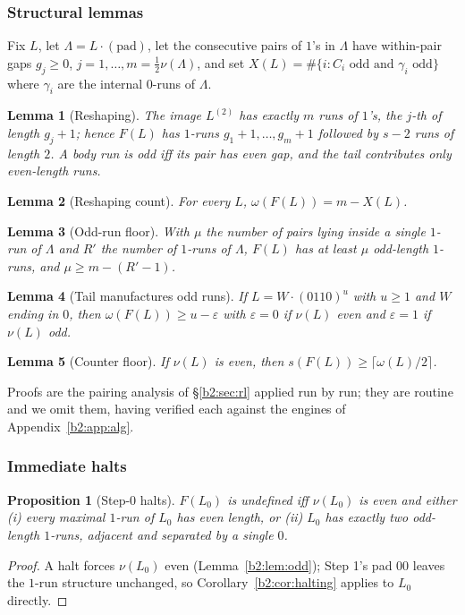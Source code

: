 \documentclass[a4paper]{article}
\theoremstyle{plain}
\newtheorem{proposition}{Proposition}[subsection]
\newtheorem{lemma}{Lemma}[subsection]
\theoremstyle{definition}
\theoremstyle{remark}
\begin{document}
\subsubsection{Structural lemmas}\label{b2:sec:struct}
Fix $L$, let $\Lambda=L\cdot(\text{pad})$, let the consecutive pairs of $1$'s in $\Lambda$ have within-pair gaps $g_j\ge 0$, $j=1,\dots,m=\tfrac12\nu(\Lambda)$, and set $X(L)=\#\{i:C_i\text{ odd and }\gamma_i\text{ odd}\}$ where $\gamma_i$ are the internal $0$-runs of $\Lambda$.

\begin{lemma}[Reshaping]\label{b2:lem:reshape}
The image $L^{(2)}$ has exactly $m$ runs of $1$'s, the $j$-th of length $g_j+1$; hence $F(L)$ has $1$-runs $g_1+1,\dots,g_m+1$ followed by $s-2$ runs of length $2$. A body run is odd iff its pair has even gap, and the tail contributes only even-length runs.
\end{lemma}

\begin{lemma}[Reshaping count]\label{b2:lem:reshapecount}
For every $L$, $\omega(F(L))=m-X(L)$.
\end{lemma}

\begin{lemma}[Odd-run floor]\label{b2:lem:oddrunfloor}
With $\mu$ the number of pairs lying inside a single $1$-run of $\Lambda$ and $R'$ the number of $1$-runs of $\Lambda$, $F(L)$ has at least $\mu$ odd-length $1$-runs, and $\mu\ge m-(R'-1)$.
\end{lemma}

\begin{lemma}[Tail manufactures odd runs]\label{b2:lem:tailodd}
If $L=W\cdot(0110)^u$ with $u\ge 1$ and $W$ ending in $0$, then $\omega(F(L))\ge u-\varepsilon$ with $\varepsilon=0$ if $\nu(L)$ even and $\varepsilon=1$ if $\nu(L)$ odd.
\end{lemma}

\begin{lemma}[Counter floor]\label{b2:lem:cfloor}
If $\nu(L)$ is even, then $s(F(L))\ge\lceil\omega(L)/2\rceil$.
\end{lemma}

Proofs are the pairing analysis of \S\ref{b2:sec:rl} applied run by run; they are routine and we omit them, having verified each against the engines of Appendix~\ref{b2:app:alg}.

\subsubsection{Immediate halts}\label{b2:sec:step0}
\begin{proposition}[Step-$0$ halts]\label{b2:prop:step0}
$F(L_0)$ is undefined iff $\nu(L_0)$ is even and either (i) every maximal $1$-run of $L_0$ has even length, or (ii) $L_0$ has exactly two odd-length $1$-runs, adjacent and separated by a single $0$.
\end{proposition}
\begin{proof}
A halt forces $\nu(L_0)$ even (Lemma~\ref{b2:lem:odd}); Step 1's pad $00$ leaves the $1$-run structure unchanged, so Corollary~\ref{b2:cor:halting} applies to $L_0$ directly.
\end{proof}
\end{document}
